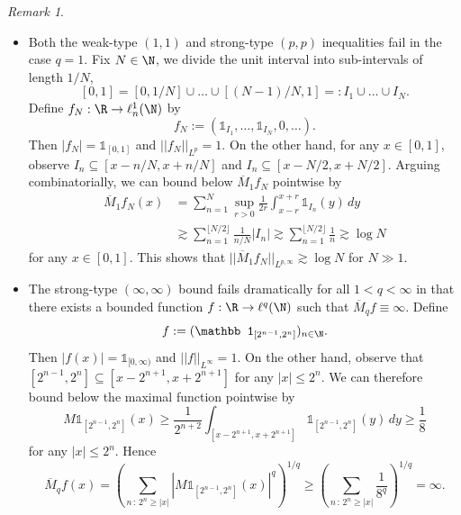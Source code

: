 \documentclass[reqno]{amsart}
\theoremstyle{definition}
\theoremstyle{remark}
\newtheorem*{remark}{Remark}
\begin{document}
\begin{remark}
\leavevmode
\begin{itemize}
	\item 
	Both the weak-type $(1, 1)$ and strong-type $(p, p)$ inequalities fail in the case $q = 1$. Fix $N \in \N$, we divide the unit interval into sub-intervals of length $1/N$, 
		\[ [0, 1] = [0, 1/N] \cup \dots \cup [(N - 1)/N, 1] =: I_1 \cup \dots \cup I_N. \]
	Define $f_N : \R \to \ell^1_n (\N)$ by
		\[ f_N :=  (\mathbb 1_{I_1}, \dots, \mathbb 1_{I_N}, 0, \dots ). \]	
	Then $|f_N| = \mathbb 1_{[0, 1]}$ and $||f_N||_{L^p} = 1$. On the other hand, for any $x \in [0, 1]$, observe $I_n \subseteq [x - n/N, x + n/N]$ and $I_n \subseteq [x - N/2, x + N/2]$.	Arguing combinatorially, we can bound below $\overline M_1 f_N$ pointwise by 
		\begin{align*}
			 \overline{M}_1 f_N (x) 
			 &= \sum_{n = 1}^N \sup_{r > 0} \frac{1}{2r} \int_{x - r}^{x + r} \mathbb 1_{I_n} (y) \, dy \\
			 &\gtrsim \sum_{n = 1}^{\lfloor N/2 \rfloor} \frac{1}{n/N} |I_n| \gtrsim \sum_{n = 1}^{\lfloor N/2 \rfloor} \frac1n \gtrsim \log N
		\end{align*}	 
	for any $x \in [0, 1]$. This shows that $||\overline M_1 f_N ||_{L^{p, \infty}} \gtrsim \log N$ for $N \gg 1$. 
	
	\item 
	The strong-type $(\infty, \infty)$ bound fails dramatically for all $1 < q < \infty$ in that there exists a bounded function $f: \R \to \ell^q (\N)$ such  that $\overline M_q f \equiv \infty$. Define
					\[ f := (\mathbb 1_{[2^{n - 1}, 2^n]})_{n \in \N}.\]
				Then $|f(x)| = \mathbb 1_{[0, \infty)}$ and $||f||_{L^\infty} = 1$. On the other hand, observe that $[2^{n - 1}, 2^{n}] \subseteq [x - 2^{n + 1}, x + 2^{n + 1}]$ for any $|x| \leq 2^{n}$. We can therefore bound below the maximal function pointwise by
					\[ M \mathbb 1_{[2^{n - 1}, 2^n]} (x) \geq \frac{1}{2^{n + 2}} \int_{[x - 2^{n + 1}, x + 2^{n + 1}]} \mathbb 1_{[2^{n - 1}, 2^{n}]} (y) \, dy \geq \frac18\]	
		for any $|x| \leq 2^n$. Hence
			\[ \overline M_q f(x) = \left( \sum_{n \, : \, 2^n \geq |x|} \left|M \mathbb 1_{[2^{n - 1}, 2^n]} (x) \right|^q \right)^{1/q} \geq \left( \sum_{n \, : \, 2^n \geq |x|} \frac{1}{8^q}  \right)^{1/q} = \infty. \]	
\end{itemize}			
\end{remark}
\end{document}
